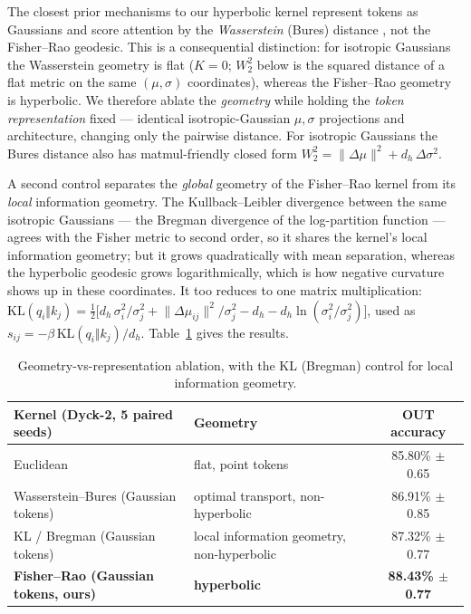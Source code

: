 \documentclass[11pt]{article}
\begin{document}
The closest prior mechanisms to our hyperbolic kernel represent tokens as Gaussians and score attention by the \emph{Wasserstein} (Bures) distance \cite{erick2023stochastic,fan2022stosa}, not the Fisher--Rao geodesic. This is a consequential distinction: for isotropic Gaussians the Wasserstein geometry is flat ($K = 0$; $W_2^2$ below is the squared distance of a flat metric on the same $(\mu, \sigma)$ coordinates), whereas the Fisher--Rao geometry is hyperbolic. We therefore ablate the \emph{geometry} while holding the \emph{token representation} fixed --- identical isotropic-Gaussian $\mu, \sigma$ projections and architecture, changing only the pairwise distance. For isotropic Gaussians the Bures distance also has matmul-friendly closed form $W_2^2 = \lVert\Delta\mu\rVert^2 + d_h\,\Delta\sigma^2$.

A second control separates the \emph{global} geometry of the Fisher--Rao kernel from its \emph{local} information geometry. The Kullback--Leibler divergence between the same isotropic Gaussians --- the Bregman divergence of the log-partition function --- agrees with the Fisher metric to second order, so it shares the kernel's local information geometry; but it grows quadratically with mean separation, whereas the hyperbolic geodesic grows logarithmically, which is how negative curvature shows up in these coordinates. It too reduces to one matrix multiplication: $\mathrm{KL}(q_i \Vert k_j) = \tfrac12\big[d_h\,\sigma_i^2/\sigma_j^2 + \lVert\Delta\mu_{ij}\rVert^2/\sigma_j^2 - d_h - d_h \ln(\sigma_i^2/\sigma_j^2)\big]$, used as $s_{ij} = -\beta\,\mathrm{KL}(q_i \Vert k_j)/d_h$. Table~\ref{tab:geomvsrep} gives the results.

\begin{table}[h]
\centering\footnotesize
\begin{tabular}{llc}
\toprule
Kernel (Dyck-2, 5 paired seeds) & Geometry & OUT accuracy \\
\midrule
Euclidean & flat, point tokens & 85.80\% $\pm$ 0.65 \\
Wasserstein--Bures (Gaussian tokens) & optimal transport, non-hyperbolic & 86.91\% $\pm$ 0.85 \\
KL / Bregman (Gaussian tokens) & local information geometry, non-hyperbolic & 87.32\% $\pm$ 0.77 \\
\textbf{Fisher--Rao (Gaussian tokens, ours)} & \textbf{hyperbolic} & \textbf{88.43\% $\pm$ 0.77} \\
\bottomrule
\end{tabular}
\caption{Geometry-vs-representation ablation, with the KL (Bregman) control for local information geometry.}
\label{tab:geomvsrep}
\end{table}
\end{document}
